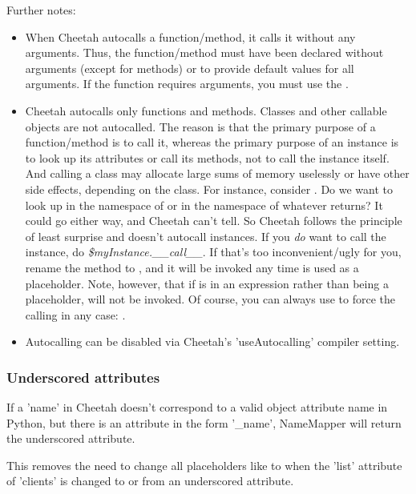 Further notes:
\begin{itemize}
\item When Cheetah autocalls a function/method, it calls it without any
arguments.  Thus, the function/method must have been declared without arguments
(except  for methods) or to provide default values for all arguments.
If the function requires arguments, you must use the \code{()}.

\item Cheetah autocalls only functions and methods.  Classes and other callable
objects are not autocalled.  The reason is that the primary purpose of a
function/method is to call it, whereas the primary purpose of an instance is to
look up its attributes or call its methods, not to call the instance itself.
And calling a class may allocate large sums of memory uselessly or have other
side effects, depending on the class.  For instance, consider
.
Do we want to look up  in the namespace of  or
in the namespace of whatever  returns?  It could go either way,
and Cheetah can't tell.  So Cheetah follows the principle of least surprise and
doesn't autocall instances.  If you {\em do} want to call the instance, do
{\em \$myInstance.\_\_call\_\_}.  If that's too inconvenient/ugly for you,
rename the method to , and it will be invoked any time 
 is used as a placeholder.  Note, however, that if
 is in an expression rather than being a placeholder,
 will not be invoked.  Of course, you can always use
\code{()} to force the calling in any case: .

\item Autocalling can be disabled via Cheetah's 'useAutocalling' compiler
setting.
\end{itemize}

\subsubsection{Underscored attributes}
\label{language.namemapper.underscore}

If a 'name' in Cheetah doesn't correspond to a valid object attribute name in
Python, but there is an attribute in the form '\_name', NameMapper will return
the underscored attribute.

This removes the need to change all placeholders like  to
 when the 'list' attribute of 'clients' is changed to or
from an underscored attribute.


